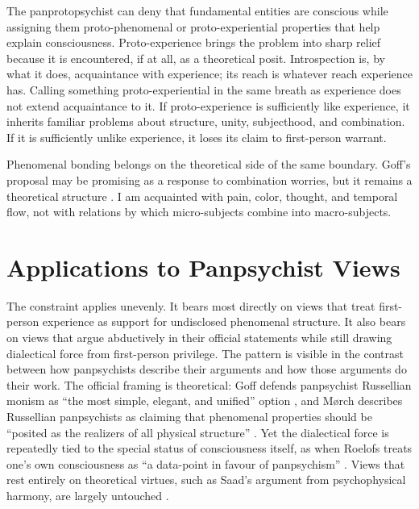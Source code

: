 The panprotopsychist can deny that fundamental entities are conscious while assigning them proto-phenomenal or proto-experiential properties that help explain consciousness. Proto-experience brings the problem into sharp relief because it is encountered, if at all, as a theoretical posit. Introspection is, by what it does, acquaintance with experience; its reach is whatever reach experience has. Calling something proto-experiential in the same breath as experience does not extend acquaintance to it. If proto-experience is sufficiently like experience, it inherits familiar problems about structure, unity, subjecthood, and combination. If it is sufficiently unlike experience, it loses its claim to first-person warrant.

Phenomenal bonding belongs on the theoretical side of the same boundary. Goff's proposal may be promising as a response to combination worries, but it remains a theoretical structure \citep{goff2017bonding}. I am acquainted with pain, color, thought, and temporal flow, not with relations by which micro-subjects combine into macro-subjects.

\section{Applications to Panpsychist Views}

The constraint applies unevenly. It bears most directly on views that treat first-person experience as support for undisclosed phenomenal structure. It also bears on views that argue abductively in their official statements while still drawing dialectical force from first-person privilege. The pattern is visible in the contrast between how panpsychists describe their arguments and how those arguments do their work. The official framing is theoretical: Goff defends panpsychist Russellian monism as ``the most simple, elegant, and unified'' option \citep[169]{goff2017cfr}, and M{\o}rch describes Russellian panpsychists as claiming that phenomenal properties should be ``posited as the realizers of all physical structure'' \citep{morch2020metaproblem}. Yet the dialectical force is repeatedly tied to the special status of consciousness itself, as when Roelofs treats one's own consciousness as ``a data-point in favour of panpsychism'' \citep[121]{roelofs2021science}. Views that rest entirely on theoretical virtues, such as Saad's argument from psychophysical harmony, are largely untouched \citep{saad2022}.

